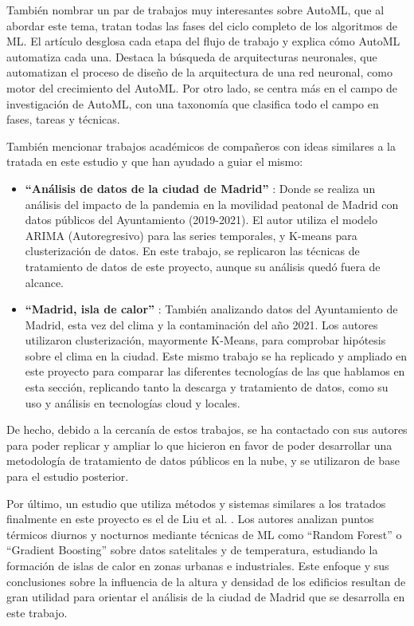 También nombrar un par de trabajos muy interesantes sobre AutoML, que al abordar este tema, tratan todas las fases del ciclo completo de los algoritmos de ML. El artículo \citep{SALEHIN202452} desglosa cada etapa del flujo de trabajo y explica cómo AutoML automatiza cada una. Destaca la búsqueda de arquitecturas neuronales, que automatizan el proceso de diseño de la arquitectura de una red neuronal, como motor del crecimiento del AutoML. Por otro lado, \citep{Barbudo2023} se centra más en el campo de investigación de AutoML, con una taxonomía que clasifica todo el campo en fases, tareas y técnicas.

También mencionar trabajos académicos de compañeros con ideas similares a la tratada en este estudio y que han ayudado a guiar el mismo:
\begin{itemize}
	\item \textbf{``Análisis de datos de la ciudad de Madrid''} \citep{SaizSantos2023}: Donde se realiza un análisis del impacto de la pandemia en la movilidad peatonal de Madrid con datos públicos del Ayuntamiento (2019-2021). El autor utiliza el modelo ARIMA (Autoregresivo) para las series temporales, y K-means para clusterización de datos. En este trabajo, se replicaron las técnicas de tratamiento de datos de este proyecto, aunque su análisis quedó fuera de alcance.
	
	\item \textbf{``Madrid, isla de calor''} \citep{Meneses2023Madrid}: También analizando datos del Ayuntamiento de Madrid, esta vez del clima y la contaminación del año 2021. Los autores utilizaron clusterización, mayormente K-Means, para comprobar hipótesis sobre el clima en la ciudad. Este mismo trabajo se ha replicado y ampliado en este proyecto para comparar las diferentes tecnologías de las que hablamos en esta sección, replicando tanto la descarga y tratamiento de datos, como su uso y análisis en tecnologías cloud y locales.
\end{itemize}
De hecho, debido a la cercanía de estos trabajos, se ha contactado con sus autores para poder replicar y ampliar lo que hicieron en favor de poder desarrollar una metodología de tratamiento de datos públicos en la nube, y se utilizaron de base para el estudio posterior.

Por último, un estudio que utiliza métodos y sistemas similares a los tratados finalmente en este proyecto es el de Liu et al. \citep{urbanthermal2025}. Los autores analizan puntos térmicos diurnos y nocturnos mediante técnicas de ML como ``Random Forest'' o ``Gradient Boosting'' sobre datos satelitales y de temperatura, estudiando la formación de islas de calor en zonas urbanas e industriales. Este enfoque y sus conclusiones sobre la influencia de la altura y densidad de los edificios resultan de gran utilidad para orientar el análisis de la ciudad de Madrid que se desarrolla en este trabajo.


